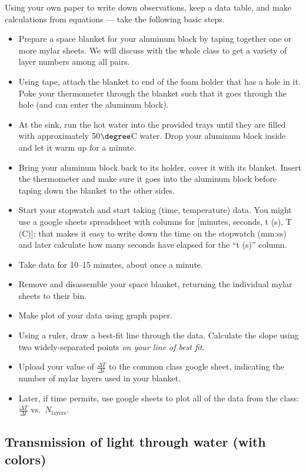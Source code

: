  Using your own paper to write down observations, keep a data table, and make calculations from equations --- take the following basic steps.
	\begin{itemize}
	\item Prepare a space blanket for your aluminum block by taping together one or more mylar sheets.  We will discuss with the whole class to get a variety of layer numbers among all pairs.
	\item Using tape, attach the blanket to end of the foam holder that has a hole in it. Poke your thermometer through the blanket such that it goes through the hole (and can enter the aluminum block).
	\item At the sink, run the hot water into the provided trays until they are filled with approximately 50$\degree$C water.  Drop your aluminum block inside and let it warm up for a minute.
	\item Bring your aluminum block back to its holder, cover it with its blanket. Insert the thermometer and make sure it goes into the aluminum block before taping down the blanket to the other sides.
	\item Start your stopwatch and start taking (time, temperature) data.  You might use a google sheets spreadsheet with columns for [minutes, seconds, t (s), T (C)]; that makes it easy to write down the time on the stopwatch (mm:ss) and later calculate how many seconds have elapsed for the ``t (s)'' column.
	\item Take data for 10--15 minutes, about once a minute.
	\item Remove and disassemble your space blanket, returning the individual mylar sheets to their bin.
	\item Make plot of your data using graph paper.  
	\item Using a ruler, draw a best-fit line through the data.  Calculate the slope using two widely-separated points {\em on your line of best fit}.
	\item Upload your value of $\frac{\Delta T}{\Delta t}$ to the common class google sheet, indicating the number of mylar layers used in your blanket.
	\item Later, if time permits, use google sheets to plot all of the data from the class: $\frac{\Delta T}{\Delta t}$ vs.\ $N_\text{layers}$.  
	\end{itemize}


\newpage


\subsection{Transmission of light through water (with colors)}

